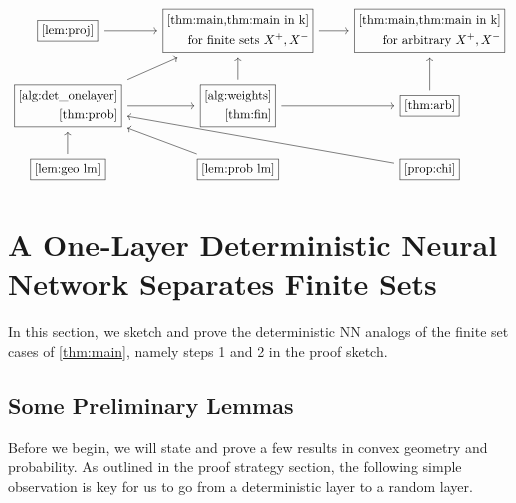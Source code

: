 \documentclass[aoap]{imsart}
\numberwithin{equation}{section}
\theoremstyle{definition}
\theoremstyle{remark}
\numberwithin{equation}{section}
\newcommand{\0}{\mathbf{0}}
\newcommand{\1}{\mathbf{1}}
\numberwithin{equation}{section}
\begin{document}
\[\begin{tikzcd}
\boxed{\text{\cref{lem:proj}}} \arrow[r]                            & \boxed{\begin{aligned}\text{\cref{thm:main,thm:main in k}} \\ \text{for finite sets $X^+, X^-$}\end{aligned}} \arrow[r] & \boxed{\begin{aligned}\text{\cref{thm:main,thm:main in k}} \\ \text{for arbitrary $X^+, X^-$}\end{aligned}} \\
\boxed{\begin{aligned}\text{\cref{alg:det_onelayer}}\\ \text{\cref{thm:prob}}\end{aligned}} \arrow[ru] \arrow[r] & \boxed{\begin{aligned}\text{\cref{alg:weights}}\\\text{\cref{thm:fin}}\end{aligned}} \arrow[u] \arrow[r]          & \boxed{\text{\cref{thm:arb}}} \arrow[u]                             \\
\boxed{\text{\cref{lem:geo lm}}} \arrow[u]                          & \boxed{\text{\cref{lem:prob lm}}} \arrow[lu]           & \boxed{\text{\cref{prop:chi}}} \arrow[llu]  
\end{tikzcd}\]

\section{A One-Layer Deterministic Neural Network Separates Finite Sets}\label{sec:One}
In this section, we sketch and prove the deterministic NN analogs of the finite set cases of \cref{thm:main}, namely steps 1 and 2 in the proof sketch.

\subsection{Some Preliminary Lemmas}\label{sec:prelim}
Before we begin, we will state and prove a few results in convex geometry and probability. As outlined in the proof strategy section, the following simple observation is key for us to go from a deterministic layer to a random layer.
\end{document}
